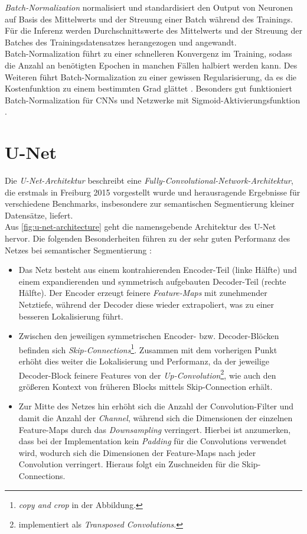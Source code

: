 \textit{Batch-Normalization} normalisiert und standardisiert den Output von Neuronen auf Basis des Mittelwerts 
und der Streuung einer Batch während des Trainings. Für die Inferenz werden Durchschnittswerte 
des Mittelwerts und der Streuung der Batches des Trainingsdatensatzes herangezogen und angewandt. \\
Batch-Normalization führt zu einer schnelleren Konvergenz im Training, 
sodass die Anzahl an benötigten Epochen in manchen Fällen halbiert werden kann. Des Weiteren führt 
Batch-Normalization zu einer gewissen Regularisierung, da es die Kostenfunktion zu einem bestimmten Grad glättet 
\cites{Goodfellow.2016}{Ioffe.11022015}.
Besonders gut funktioniert Batch-Normalization für \acp{CNN} und Netzwerke mit Sigmoid-Aktivierungsfunktion
\cites{Goodfellow.2016}.

\section{U-Net} \label{sec:architekturkomponenten:unet}

Die \textit{U-Net-Architektur} beschreibt eine \textit{Fully-Convolutional-Network-Architektur}, die erstmals in Freiburg 2015 vorgestellt wurde 
und herausragende Ergebnisse für verschiedene Benchmarks, insbesondere zur semantischen Segmentierung kleiner Datensätze, liefert. \\
Aus \autoref{fig:u-net-architecture} geht die namensgebende Architektur des U-Net hervor. Die folgenden Besonderheiten 
führen zu der sehr guten Performanz des Netzes bei semantischer Segmentierung \cite{Ronneberger.18052015}:
\begin{itemize}
	\item Das Netz besteht aus einem kontrahierenden Encoder-Teil (linke Hälfte) und einem expandierenden und symmetrisch aufgebauten
	Decoder-Teil (rechte Hälfte). Der Encoder erzeugt feinere \textit{Feature-Maps} mit zunehmender Netztiefe, 
	während der Decoder diese wieder extrapoliert, was zu einer besseren Lokalisierung führt. 
	\item Zwischen den jeweiligen symmetrischen Encoder- bzw. Decoder-Blöcken befinden sich \textit{Skip-Connections}\footnote{\textit{copy and crop} in der Abbildung.}.
	Zusammen mit dem vorherigen Punkt erhöht dies weiter die Lokalisierung und Performanz, da der jeweilige Decoder-Block feinere Features von der \textit{Up-Convolution}\footnote{implementiert als \textit{Transposed Convolutions}.},
	wie auch den größeren Kontext von früheren Blocks mittels Skip-Connection erhält. 
	\item Zur Mitte des Netzes hin erhöht sich die Anzahl der Convolution-Filter und damit die Anzahl der \textit{Channel}, 
	während sich die Dimensionen der einzelnen Feature-Maps durch das \textit{Downsampling} verringert. 
	Hierbei ist anzumerken, dass bei der Implementation kein \textit{Padding} für die Convolutions verwendet wird,
	wodurch sich die Dimensionen der Feature-Maps nach jeder Convolution verringert. 
	Hieraus folgt ein Zuschneiden für die Skip-Connections. 
\end{itemize}

